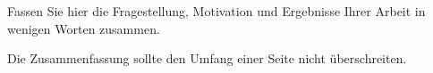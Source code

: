 Fassen Sie hier die Fragestellung, Motivation und Ergebnisse Ihrer Arbeit
in wenigen Worten zusammen.

Die Zusammenfassung sollte den Umfang einer Seite nicht überschreiten.

